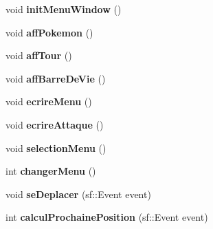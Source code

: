\begin{DoxyCompactItemize}
\item 
\mbox{\label{class_aff_s_f_m_l_ab980396e1d48cc6ec576a44a009ea2a5}} 
void {\bfseries init\+Menu\+Window} ()
\item 
\mbox{\label{class_aff_s_f_m_l_a121ff90a0c4daad2dfa5573ab36876fb}} 
void {\bfseries aff\+Pokemon} ()
\item 
\mbox{\label{class_aff_s_f_m_l_aaa17b0401f3d0b33511cbda998fd02fe}} 
void {\bfseries aff\+Tour} ()
\item 
\mbox{\label{class_aff_s_f_m_l_ae2b27e221cc19b98f140da14c8c66c51}} 
void {\bfseries aff\+Barre\+De\+Vie} ()
\item 
\mbox{\label{class_aff_s_f_m_l_afbdfbdc30a5a9741e7d64ad399725a7d}} 
void {\bfseries ecrire\+Menu} ()
\item 
\mbox{\label{class_aff_s_f_m_l_a14a925ba9c7608cb719c36eca5375ac5}} 
void {\bfseries ecrire\+Attaque} ()
\item 
\mbox{\label{class_aff_s_f_m_l_a06ce8eae7c1791cd47c9d6c0cf541c6d}} 
void {\bfseries selection\+Menu} ()
\item 
\mbox{\label{class_aff_s_f_m_l_ad216b232d62f53af5eb2b93f6f92dc5a}} 
int {\bfseries changer\+Menu} ()
\item 
\mbox{\label{class_aff_s_f_m_l_ace2c2e0c1f8e497276938e9dcd67fcca}} 
void {\bfseries se\+Deplacer} (sf\+::\+Event event)
\item 
\mbox{\label{class_aff_s_f_m_l_aefbe26306f67ca8dd980bf29b8f0ff5b}} 
int {\bfseries calcul\+Prochaine\+Position} (sf\+::\+Event event)
\end{DoxyCompactItemize}
